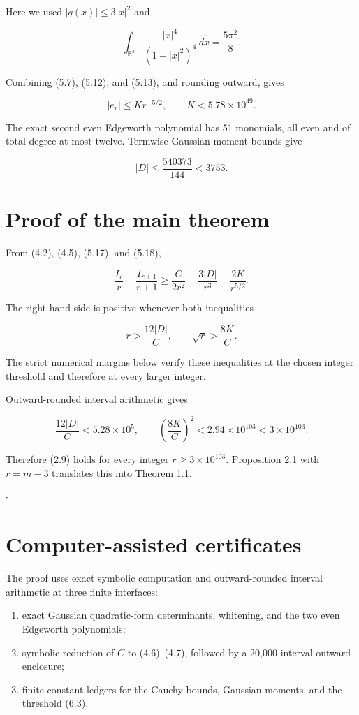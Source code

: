 \documentclass[11pt]{article}
\begin{document}
Here we used $|q(x)|\le3|x|^2$ and

\[
\int_{\mathbb R^3}\frac{|x|^4}{(1+|x|^2)^4}\,dx
=\frac{5\pi^2}{8}.
\]

Combining (5.7), (5.12), and (5.13), and rounding outward, gives

\[
|e_r|\le Kr^{-5/2},\qquad K<5.78\times10^{49}.          \tag{5.17}
\]

The exact second even Edgeworth polynomial has 51 monomials, all even and of total degree at most twelve.  Termwise Gaussian moment bounds give

\[
|D|\le\frac{540373}{144}<3753.                           \tag{5.18}
\]

\section{Proof of the main theorem}

From (4.2), (4.5), (5.17), and (5.18),

\[
\frac{I_r}{r}-\frac{I_{r+1}}{r+1}
\ge \frac{C}{2r^2}-\frac{3|D|}{r^3}-\frac{2K}{r^{5/2}}. \tag{6.1}
\]

The right-hand side is positive whenever both inequalities

\[
r>\frac{12|D|}{C},\qquad
\sqrt r>\frac{8K}{C}.                                  \tag{6.2}
\]

The strict numerical margins below verify these inequalities at the chosen integer threshold and therefore at every larger integer.

Outward-rounded interval arithmetic gives

\[
\frac{12|D|}{C}<5.28\times10^5,
\qquad
\left(\frac{8K}{C}\right)^2
<2.94\times10^{103}<3\times10^{103}.                   \tag{6.3}
\]

Therefore (2.9) holds for every integer $r\ge3\times10^{103}$.  Proposition 2.1 with $r=m-3$ translates this into Theorem 1.1.

\hfill$\square$

\section{Computer-assisted certificates}

The proof uses exact symbolic computation and outward-rounded interval arithmetic at three finite interfaces:

\begin{enumerate}
\item exact Gaussian quadratic-form determinants, whitening, and the two even Edgeworth polynomials;
\item symbolic reduction of $C$ to (4.6)--(4.7), followed by a 20,000-interval outward enclosure;
\item finite constant ledgers for the Cauchy bounds, Gaussian moments, and the threshold (6.3).
\end{enumerate}
\end{document}
